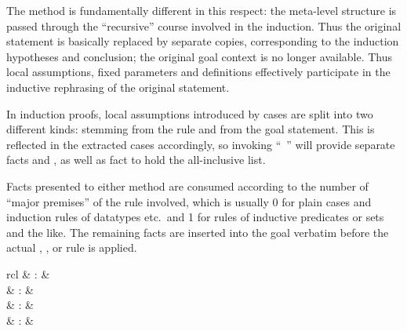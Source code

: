 \begin{isabellebody}
\begin{isamarkuptext}
  The \hyperlink{method.induct}{\mbox{}} method is fundamentally different in this
  respect: the meta-level structure is passed through the
  ``recursive'' course involved in the induction.  Thus the original
  statement is basically replaced by separate copies, corresponding to
  the induction hypotheses and conclusion; the original goal context
  is no longer available.  Thus local assumptions, fixed parameters
  and definitions effectively participate in the inductive rephrasing
  of the original statement.

  In induction proofs, local assumptions introduced by cases are split
  into two different kinds:  stemming from the rule and
   from the goal statement.  This is reflected in the
  extracted cases accordingly, so invoking ``\hyperlink{command.case}{\mbox{}}~'' will provide separate facts  and ,
  as well as fact  to hold the all-inclusive list.

  \medskip Facts presented to either method are consumed according to
  the number of ``major premises'' of the rule involved, which is
  usually 0 for plain cases and induction rules of datatypes etc.\ and
  1 for rules of inductive predicates or sets and the like.  The
  remaining facts are inserted into the goal verbatim before the
  actual , , or  rule is
  applied.%
\end{isamarkuptext}%
\isamarkuptrue%
%
\isamarkuptrue%
%
\begin{isamarkuptext}%
\begin{matharray}{rcl}
    \hypertarget{command.print-induct-rules}{\hyperlink{command.print-induct-rules}{\mbox{}}} & : &  \\
    \hypertarget{attribute.cases}{\hyperlink{attribute.cases}{\mbox{}}} & : &  \\
    \hypertarget{attribute.induct}{\hyperlink{attribute.induct}{\mbox{}}} & : &  \\
    \hypertarget{attribute.coinduct}{\hyperlink{attribute.coinduct}{\mbox{}}} & : &  \\
  \end{matharray}


\end{isamarkuptext}
\end{isabellebody}
